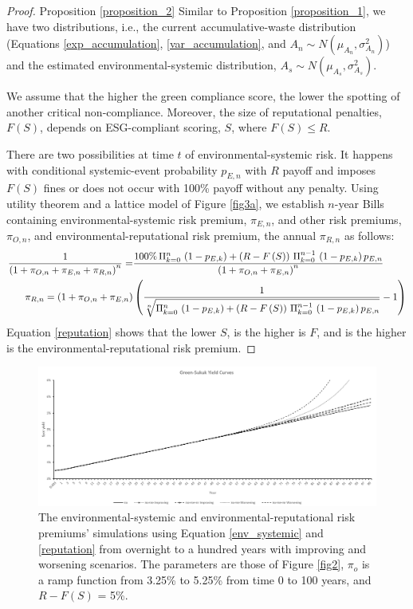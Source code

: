 \documentclass[sn-basic]{sn-jnl}%
\theoremstyle{thmstyleone}%
\theoremstyle{thmstyletwo}%
\theoremstyle{thmstylethree}%
\begin{document}
\begin{proof}{Proposition \ref{proposition_2}}
	Similar to Proposition \ref{proposition_1}, we have two distributions, i.e., the current accumulative-waste distribution (Equations \ref{exp_accumulation}, \ref{var_accumulation}, and $A_n\sim N\left(\mu_{A_n},\sigma_{A_n}^2\right)$) and the estimated environmental-systemic distribution, $A_s\sim N\left(\mu_{A_s},\sigma_{A_s}^2\right)$.
	
	We assume that the higher the green compliance score, the lower the spotting of another critical non-compliance. Moreover, the size of reputational penalties, $F\left(S\right)$, depends on ESG-compliant scoring, $S$, where $F\left(S\right) \leq R$.
	
	There are two possibilities at time $t$ of environmental-systemic risk. It happens with conditional systemic-event probability $p_{E,n}$ with $R$ payoff and imposes $F\left(S\right)$ fines or does not occur with 100\% payoff without any penalty. Using \citeauthor{von2007theory} utility theorem and a lattice model of Figure \ref{fig3a}, we establish $n$-year Bills containing environmental-systemic risk premium, $\pi_{E,n}$, and other risk premiums, $\pi_{O,n}$, and environmental-reputational risk premium, the annual $\pi_{R,n}$ as follows:
	\footnotesize
	\begin{align}\label{reputation}
		\frac{1}{\left(1+\pi_{O,n}+\pi_{E,n}+\pi_{R,n}\right)^n }=& \frac{100\%\,\Pi_{k=0}^n\,\left(1-p_{E,k}\right)+\left(R-F\left(S\right)\right) \,\Pi_{k=0}^{n-1}\,\left(1-p_{E,k}\right)p_{E,n}}{\left(1+\pi_{O,n}+\pi_{E,n}\right)^n}\notag\\
		\pi_{R,n}=\left(1+\pi_{O,n}+\pi_{E,n}\right)& \left(\frac{1}{\sqrt[n]{\Pi_{k=0}^n\,\left(1-p_{E,k}\right)+\left(R-F\left(S\right)\right) \,\Pi_{k=0}^{n-1}\,\left(1-p_{E,k}\right)p_{E,n}}}-1\right)
	\end{align}
	\normalsize
	Equation \ref{reputation} shows that the lower $S$, is the higher is $F$, and is the higher is the environmental-reputational risk premium.
\end{proof}
	
	\begin{figure}[h!]
		\centering
		\includegraphics[width=1.0\textwidth]{Fig5_BW}
		\caption{The environmental-systemic and environmental-reputational risk premiums' simulations using Equation \ref{env_systemic} and \ref{reputation} from overnight to a hundred years with improving and worsening scenarios. The parameters are those of Figure \ref{fig2}, $\pi_o$ is a ramp function from 3.25\% to 5.25\% from time 0 to 100 years, and $R-F\left(S\right)$ = 5\%.}
		\label{fig6}
	\end{figure}
\end{document}
